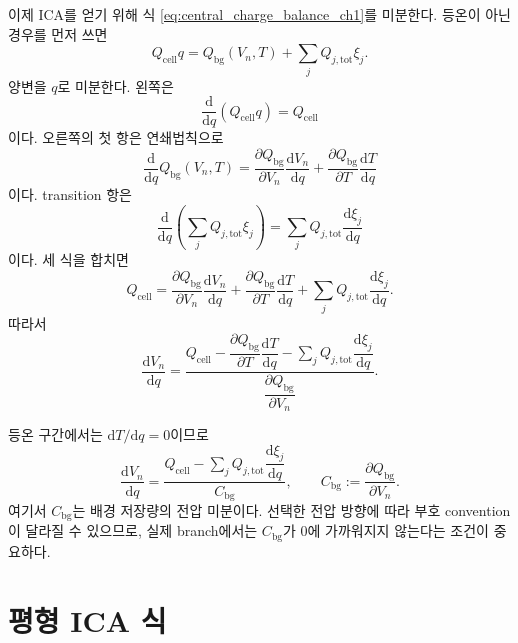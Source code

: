 \documentclass[11pt,a4paper]{article}
\newcommand{\dd}{\mathrm{d}}
\newcommand{\cell}{\mathrm{cell}}
\newcommand{\bg}{\mathrm{bg}}
\newcommand{\tot}{\mathrm{tot}}
\begin{document}
이제 ICA를 얻기 위해 식 \eqref{eq:central_charge_balance_ch1}를 미분한다. 등온이 아닌 경우를 먼저 쓰면
\begin{equation}
Q_{\cell}q
=
Q_{\bg}(V_n,T)
+\sum_jQ_{j,\tot}\xi_j.
\label{eq:balance_before_diff}
\end{equation}
양변을 \(q\)로 미분한다. 왼쪽은
\begin{equation}
\frac{\dd}{\dd q}(Q_{\cell}q)=Q_{\cell}
\label{eq:left_diff}
\end{equation}
이다. 오른쪽의 첫 항은 연쇄법칙으로
\begin{equation}
\frac{\dd}{\dd q}Q_{\bg}(V_n,T)
=
\frac{\partial Q_{\bg}}{\partial V_n}\frac{\dd V_n}{\dd q}
+
\frac{\partial Q_{\bg}}{\partial T}\frac{\dd T}{\dd q}
\label{eq:qbg_chain_rule}
\end{equation}
이다. transition 항은
\begin{equation}
\frac{\dd}{\dd q}
\left(
\sum_jQ_{j,\tot}\xi_j
\right)
=
\sum_jQ_{j,\tot}\frac{\dd \xi_j}{\dd q}
\label{eq:transition_diff}
\end{equation}
이다. 세 식을 합치면
\begin{equation}
Q_{\cell}
=
\frac{\partial Q_{\bg}}{\partial V_n}\frac{\dd V_n}{\dd q}
+
\frac{\partial Q_{\bg}}{\partial T}\frac{\dd T}{\dd q}
+
\sum_jQ_{j,\tot}\frac{\dd \xi_j}{\dd q}.
\label{eq:diff_balance_full}
\end{equation}
따라서
\begin{equation}
\frac{\dd V_n}{\dd q}
=
\frac{
Q_{\cell}
-
\dfrac{\partial Q_{\bg}}{\partial T}\dfrac{\dd T}{\dd q}
-
\sum_jQ_{j,\tot}\dfrac{\dd \xi_j}{\dd q}
}{
\dfrac{\partial Q_{\bg}}{\partial V_n}
}.
\label{eq:dvn_dq_general_theory}
\end{equation}

등온 구간에서는 \(\dd T/\dd q=0\)이므로
\begin{equation}
\frac{\dd V_n}{\dd q}
=
\frac{
Q_{\cell}
-
\sum_jQ_{j,\tot}\dfrac{\dd \xi_j}{\dd q}
}{
C_{\bg}
},
\qquad
C_{\bg}:=\frac{\partial Q_{\bg}}{\partial V_n}.
\label{eq:dvn_dq_iso_theory}
\end{equation}
여기서 \(C_{\bg}\)는 배경 저장량의 전압 미분이다. 선택한 전압 방향에 따라 부호 convention이 달라질 수 있으므로, 실제 branch에서는 \(C_{\bg}\)가 0에 가까워지지 않는다는 조건이 중요하다.

\section{평형 ICA 식}
\end{document}
